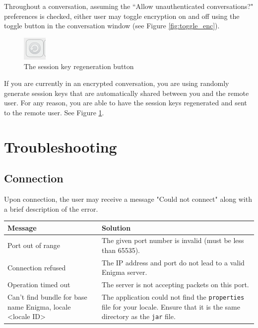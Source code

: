   Throughout a conversation, assuming the ``Allow unauthenticated conversations?" preferences is checked, either user may toggle encryption on and off using the toggle button in the conversation window (see Figure \ref{fig:toggle_enc}).
  
  \begin{figure}
    \centering
    \includegraphics[scale=0.6]{./Figures/AppD/D-5-2b.png}
    \caption{The session key regeneration button}
    \label{fig:regen_keys}
  \end{figure}
  
  If you are currently in an encrypted conversation, you are using randomly generate session keys that are automatically shared between you and the remote user. For any reason, you are able to have the session keys regenerated and sent to the remote user. See Figure \ref{fig:regen_keys}.
  
\section{Troubleshooting}

\subsection{Connection}

Upon connection, the user may receive a message "Could not connect" along with a brief description of the error.

\begin{center}
  \begin{tabular}{|l|p{5.0cm}|}
    \hline
    \textbf{Message} & \textbf{Solution} \\ \hline \hline
    Port out of range & The given port number is invalid (must be less than 65535). \\ \hline
    Connection refused & The IP address and port do not lead to a valid Enigma server. \\ \hline
    Operation timed out & The server is not accepting packets on this port. \\ \hline
    Can't find bundle for base name Enigma, locale <locale ID> & The application could not find the \verb!properties! file for your locale. Ensure that it is the same directory as the \verb!jar! file. \\
    \hline
  \end{tabular}
\end{center}

